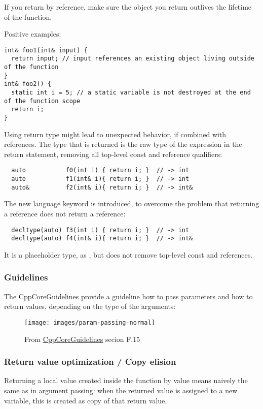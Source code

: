 If you return by reference, make sure the object you return outlives the lifetime of the function.

Positive examples:
\begin{verbatim}
int& foo1(int& input) {
  return input; // input references an existing object living outside of the function
}
int& foo2() {
  static int i = 5; // a static variable is not destroyed at the end of the function scope
  return i;
}
\end{verbatim}

\begin{rem}
  Using  return type might lead to unexpected behavior, if combined with references. The type that is returned is the raw type
  of the expression in the return statement, removing all top-level const and reference qualifiers:
  \begin{verbatim}
  auto           f0(int i) { return i; }  // -> int
  auto           f1(int& i){ return i; }  // -> int
  auto&          f2(int& i){ return i; }  // -> int&
  \end{verbatim}

  The new language keyword \marginpar{[\cxx{14}]} is introduced, to overcome the problem that returning a reference does not return a reference:
  \begin{verbatim}
  decltype(auto) f3(int i) { return i; }  // -> int
  decltype(auto) f4(int& i){ return i; }  // -> int&
  \end{verbatim}
  It is a placeholder type, as , but does not remove top-level const and references.
\end{rem}


\subsubsection{Guidelines}
The CppCoreGuidelines provide a guideline how to pass parameters and how to return values, depending on the type of the arguments:

\begin{figure}[ht]
\begin{center}
\texttt{[image: images/param-passing-normal]}
\end{center}
\caption{From \href{https://github.com/isocpp/CppCoreGuidelines/blob/master/CppCoreGuidelines.md}{CppCoreGuidelines} secion F.15}
\end{figure}


\subsubsection{Return value optimization / Copy elision}
Returning a local value created inside the function by value means naively the same as in argument passing: when the returned value is assigned to a
new variable, this is created as copy of that return value.


